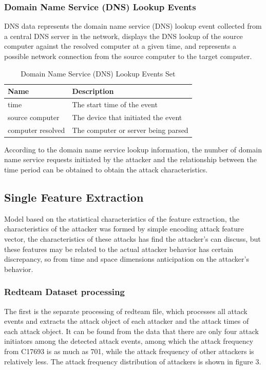 \documentclass[12pt,journal,draftcls,doublespace, letterpaper,onecolumn]{IEEEtran}
\begin{document}
\subsubsection{Domain Name Service (DNS) Lookup Events}

DNS data represents the domain name service (DNS) lookup event collected from a central DNS server in the network, displays the DNS lookup of the source computer against the resolved computer at a given time, and represents a possible network connection from the source computer to the target computer.

\begin{table}[h]
	\caption{Domain Name Service (DNS) Lookup Events Set}
	\vspace{1pt}
	\centering
	\begin{tabular}{p{2.5cm}p{5cm}}
		\hline
		Name & Description \\
		\hline
		time  & The start time of the event\\
		source computer  & The device that initiated the event\\
		computer resolved  & The computer or server being parsed\\
		\hline       
	\end{tabular}
	\label{bs2}
\end{table}

According to the domain name service lookup information, the number of domain name service requests initiated by the attacker and the relationship between the time period can be obtained to obtain the attack characteristics.

\subsection{Single Feature Extraction}

Model based on the statistical characteristics of the feature extraction, the characteristics of the attacker was formed by simple encoding attack feature vector, the characteristics of these attacks has find the attacker's can discuss, but these features may be related to the actual attacker behavior has certain discrepancy, so from time and space dimensions anticipation on the attacker's behavior.

\subsubsection{Redteam Dataset processing}
The first is the separate processing of redteam file, which processes all attack events and extracts the attack object of each attacker and the attack times of each attack object. It can be found from the data that there are only four attack initiators among the detected attack events, among which the attack frequency from C17693 is as much as 701, while the attack frequency of other attackers is relatively less. The attack frequency distribution of attackers is shown in figure 3.
\end{document}
